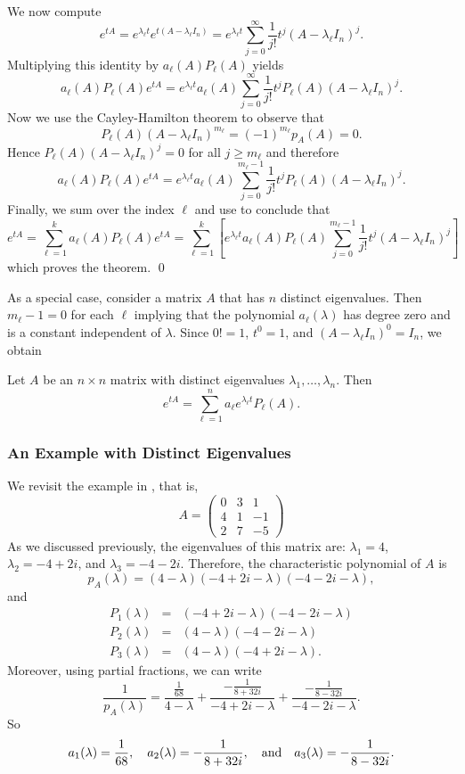 \documentclass{ximera}
\begin{document}
We now compute 
\[
e^{tA}   =  e^{\lambda_\ell t}e^{t(A-\lambda_\ell I_n)} =  
e^{\lambda_\ell t}\sum_{j=0}^\infty\frac{1}{j!}t^j(A-\lambda_\ell I_n)^j.
\]
Multiplying this identity by $a_\ell(A)P_\ell(A)$ yields
\[
a_\ell(A)P_\ell(A)e^{tA} = e^{\lambda_\ell t}a_\ell(A)
\sum_{j=0}^\infty\frac{1}{j!}t^jP_\ell(A)(A-\lambda_\ell I_n)^j.
\]
Now we use the Cayley-Hamilton theorem to observe that 
\[
P_\ell(A)(A-\lambda_\ell I_n)^{m_\ell} = (-1)^{m_\ell}p_A(A) = 0.
\]
Hence $P_\ell(A)(A-\lambda_\ell I_n)^j=0$ for all $j\ge m_\ell$
and therefore
\[
a_\ell(A)P_\ell(A)e^{tA} = e^{\lambda_\ell t}a_\ell(A)
\sum_{j=0}^{m_\ell-1}\frac{1}{j!}t^jP_\ell(A)(A-\lambda_\ell I_n)^j.
\]
Finally, we sum over the index $\ell$ and use  to conclude that
\[
e^{tA} = \sum_{\ell=1}^ka_\ell(A)P_\ell(A)e^{tA} = 
\sum_{\ell=1}^k\left[ e^{\lambda_\ell t}a_\ell(A)P_\ell(A)
\sum_{j=0}^{m_\ell-1}\frac{1}{j!}t^j(A-\lambda_\ell I_n)^j \right]
\]
which proves the theorem.  \qed  

As a special case, consider a matrix $A$ that has $n$ distinct
eigenvalues. Then $m_\ell-1=0$ for each $\ell$ implying that the polynomial
$a_\ell(\lambda)$ has degree zero and is a constant independent of $\lambda$. 
Since $0!=1$, $t^0=1$, and $(A-\lambda_\ell I_n)^0=I_n$, we obtain
\begin{cor} \label{T:etA0}
Let $A$ be an $n\times n$ matrix with distinct eigenvalues
$\lambda_1,\ldots,\lambda_n$. Then
\[
e^{tA} = \sum_{\ell=1}^n a_\ell e^{\lambda_\ell t} P_\ell(A).
\]
\end{cor}

\subsubsection*{An Example with Distinct Eigenvalues}

We revisit the example in , that is, 
\[
A = \left(\begin{array}{rrr}
     0  &  3  &  1\\
     4  &  1  & -1\\
     2  &  7  & -5
\end{array}\right)
\]
As we discussed previously, the eigenvalues of this matrix are:
$\lambda_1=4$, $\lambda_2=-4+2i$, and $\lambda_3=-4-2i$.
Therefore, the characteristic 
polynomial of $A$ is
\[
p_A(\lambda) = (4-\lambda)(-4+2i-\lambda)(-4-2i-\lambda),
\]
and
\begin{eqnarray*}
P_1(\lambda) & = & (-4+2i-\lambda)(-4-2i-\lambda) \\
P_2(\lambda)& = & (4-\lambda)(-4-2i-\lambda)\\  
P_3(\lambda) & = & (4-\lambda)(-4+2i-\lambda).
\end{eqnarray*}
Moreover, using partial fractions, 
we can write
\[
\frac{1}{p_A(\lambda)} = \frac{\frac{1}{68}}{4-\lambda} + 
\frac{-\frac{1}{8+32i}}{-4+2i-\lambda}
+ \frac{-\frac{1}{8-32i}}{-4-2i-\lambda}.
\]
So
\[
a_1(\lambda)=\frac{1}{68}, \quad a_2(\lambda)=-\frac{1}{8+32i},
 \quad\mbox{and}\quad a_3(\lambda)=-\frac{1}{8-32i}.
\]
\end{document}
